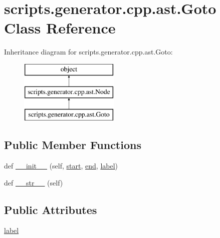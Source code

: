 \hypertarget{classscripts_1_1generator_1_1cpp_1_1ast_1_1_goto}{}\section{scripts.\+generator.\+cpp.\+ast.\+Goto Class Reference}
\label{classscripts_1_1generator_1_1cpp_1_1ast_1_1_goto}
Inheritance diagram for scripts.\+generator.\+cpp.\+ast.\+Goto\+:\begin{figure}[H]
\begin{center}
\leavevmode
\includegraphics[height=3.000000cm]{d1/dfc/classscripts_1_1generator_1_1cpp_1_1ast_1_1_goto}
\end{center}
\end{figure}
\subsection*{Public Member Functions}
\begin{DoxyCompactItemize}
\item 
def \mbox{\hyperlink{classscripts_1_1generator_1_1cpp_1_1ast_1_1_goto_af7a0e24974e6f19b796328630c426683}{\+\_\+\+\_\+init\+\_\+\+\_\+}} (self, \mbox{\hyperlink{classscripts_1_1generator_1_1cpp_1_1ast_1_1_node_a27ce0a583baee598b75ac6dd21f8575b}{start}}, \mbox{\hyperlink{classscripts_1_1generator_1_1cpp_1_1ast_1_1_node_a8e3394f9dd405352610ff9be4f284e2c}{end}}, \mbox{\hyperlink{classscripts_1_1generator_1_1cpp_1_1ast_1_1_goto_a82910f361e01800f331e3a512f11f72d}{label}})
\item 
def \mbox{\hyperlink{classscripts_1_1generator_1_1cpp_1_1ast_1_1_goto_a83be53d0eea3c9b4f0668b2a36304233}{\+\_\+\+\_\+str\+\_\+\+\_\+}} (self)
\end{DoxyCompactItemize}
\subsection*{Public Attributes}
\begin{DoxyCompactItemize}
\item 
\mbox{\hyperlink{classscripts_1_1generator_1_1cpp_1_1ast_1_1_goto_a82910f361e01800f331e3a512f11f72d}{label}}
\end{DoxyCompactItemize}


